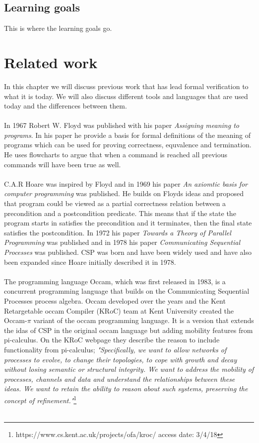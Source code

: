 \documentclass[a4paper]{report}
\begin{document}
\section{Learning goals}
This is where the learning goals go.
\chapter{Related work}
In this chapter we will discuss previous work that has lead formal verification to what it is today. We will also discuss different tools and languages that are used today and the differences between them. \\\\
In 1967 Robert W. Floyd was published with his paper \textit{Assigning meaning to programs}\cite{Floyd1967}. In his paper he provide a basis for formal definitions of the meaning of programs which can be used for proving correctness, equvalence and termination. He uses flowcharts to argue that when a command is reached all previous commands will have been true as well.\\\\
C.A.R Hoare was inspired by Floyd and in 1969 his paper \textit{An axiomtic basis for computer programming}\cite{Hoare1969} was published. He builds on Floyds ideas and proposed that program could be viewed as a partial correctness relation between a precondition and a postcondition predicate. This means that if the state the program starts in satisfies the precondition and it terminates, then the final state satisfies the postcondition. In 1972 his paper \textit{Towards a Theory of Parallel Programming} was published and in 1978 his paper \textit{Communicating Sequential Processes} was published. CSP was born and have been widely used and have also been expanded since Hoare initially described it in 1978.\\\\
The programming language Occam, which was first released in 1983, is a concurrent programming language that builds on the Communicating Sequential Processes process algebra. Occam developed over the years and the Kent Retargetable occam Compiler (KRoC) team at Kent University created the Occam-$\pi$ variant of the occam programming language. It is a version that extends the idas of CSP in the original occam language but adding mobility features from pi-calculus. On the KRoC webpage they describe the reason to include functionality from pi-calculus; \textit{"Specifically, we want to allow networks of processes to evolve, to change their topologies, to cope with growth and decay without losing semantic or structural integrity. We want to address the mobility of processes, channels and data and understand the relationships between these ideas. We want to retain the ability to reason about such systems, preserving the concept of refinement."}\footnote{https://www.cs.kent.ac.uk/projects/ofa/kroc/ access date: 3/4/18}\\\\
\end{document}
